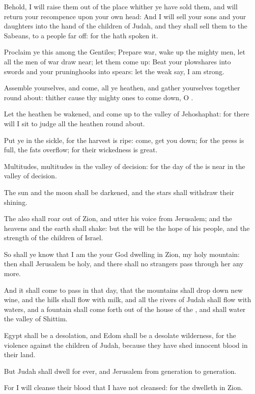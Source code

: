 \verse Behold, I will raise them out of the place whither ye have sold them, and will return your recompence upon your own head: \verse And I will sell your sons and your daughters into the hand of the children of Judah, and they shall sell them to the Sabeans, to a people far off: for the \LORD hath spoken it.

\verse Proclaim ye this among the Gentiles; Prepare war, wake up the mighty men, let all the men of war draw near; let them come up: \verse Beat your plowshares into swords and your pruninghooks into spears: let the weak say, I am strong.

\verse Assemble yourselves, and come, all ye heathen, and gather yourselves together round about: thither cause thy mighty ones to come down, O \LORD.

\verse Let the heathen be wakened, and come up to the valley of Jehoshaphat: for there will I sit to judge all the heathen round about.

\verse Put ye in the sickle, for the harvest is ripe: come, get you down; for the press is full, the fats overflow; for their wickedness is great.

\verse Multitudes, multitudes in the valley of decision: for the day of the \LORD is near in the valley of decision.

\verse The sun and the moon shall be darkened, and the stars shall withdraw their shining.

\verse The \LORD also shall roar out of Zion, and utter his voice from Jerusalem; and the heavens and the earth shall shake: but the \LORD will be the hope of his people, and the strength of the children of Israel.

\verse So shall ye know that I am the \LORD your God dwelling in Zion, my holy mountain: then shall Jerusalem be holy, and there shall no strangers pass through her any more.

\verse And it shall come to pass in that day, that the mountains shall drop down new wine, and the hills shall flow with milk, and all the rivers of Judah shall flow with waters, and a fountain shall come forth out of the house of the \LORD, and shall water the valley of Shittim.

\verse Egypt shall be a desolation, and Edom shall be a desolate wilderness, for the violence against the children of Judah, because they have shed innocent blood in their land.

\verse But Judah shall dwell for ever, and Jerusalem from generation to generation.

\verse For I will cleanse their blood that I have not cleansed: for the \LORD dwelleth in Zion.

